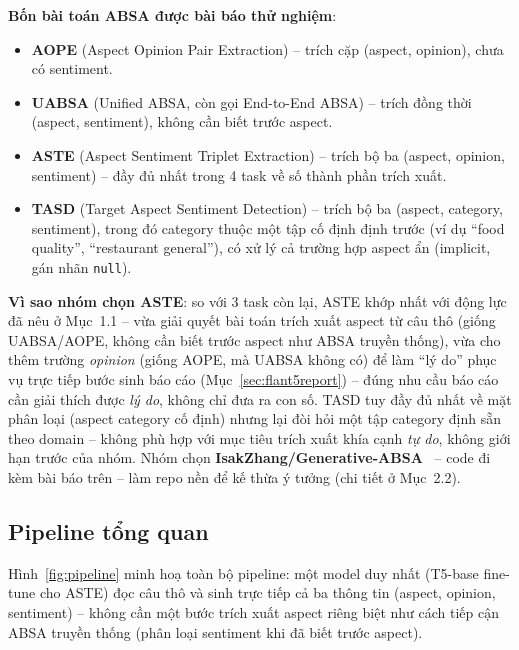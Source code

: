 \documentclass[11pt,a4paper]{article}
\begin{document}
\textbf{Bốn bài toán ABSA được bài báo thử nghiệm}:
\begin{itemize}
    \item \textbf{AOPE} (Aspect Opinion Pair Extraction) -- trích cặp
        (aspect, opinion), chưa có sentiment.
    \item \textbf{UABSA} (Unified ABSA, còn gọi End-to-End ABSA) -- trích
        đồng thời (aspect, sentiment), không cần biết trước aspect.
    \item \textbf{ASTE} (Aspect Sentiment Triplet Extraction) -- trích bộ
        ba (aspect, opinion, sentiment) -- đầy đủ nhất trong 4 task về số
        thành phần trích xuất.
    \item \textbf{TASD} (Target Aspect Sentiment Detection) -- trích bộ ba
        (aspect, category, sentiment), trong đó category thuộc một tập cố
        định định trước (ví dụ ``food quality'', ``restaurant general''),
        có xử lý cả trường hợp aspect ẩn (implicit, gán nhãn \texttt{null}).
\end{itemize}

\textbf{Vì sao nhóm chọn ASTE}: so với 3 task còn lại, ASTE khớp nhất với
động lực đã nêu ở Mục~1.1 -- vừa giải quyết bài toán trích xuất aspect từ
câu thô (giống UABSA/AOPE, không cần biết trước aspect như ABSA truyền
thống), vừa cho thêm trường \emph{opinion} (giống AOPE, mà UABSA không có)
để làm ``lý do'' phục vụ trực tiếp bước sinh báo cáo
(Mục~\ref{sec:flant5report}) -- đúng nhu cầu báo cáo cần giải thích được
\emph{lý do}, không chỉ đưa ra con số. TASD tuy đầy đủ nhất về mặt phân
loại (aspect category cố định) nhưng lại đòi hỏi một tập category định sẵn
theo domain -- không phù hợp với mục tiêu trích xuất khía cạnh \emph{tự
do}, không giới hạn trước của nhóm. Nhóm chọn
\textbf{IsakZhang/Generative-ABSA}~\cite{genabsa} -- code đi kèm bài báo
trên -- làm repo nền để kế thừa ý tưởng (chi tiết ở Mục~2.2).

\subsection{Pipeline tổng quan}

Hình~\ref{fig:pipeline} minh hoạ toàn bộ pipeline: một model duy nhất
(T5-base fine-tune cho ASTE) đọc câu thô và sinh trực tiếp cả ba thông tin
(aspect, opinion, sentiment) -- không cần một bước trích xuất aspect riêng
biệt như cách tiếp cận ABSA truyền thống (phân loại sentiment khi đã biết
trước aspect).
\end{document}
